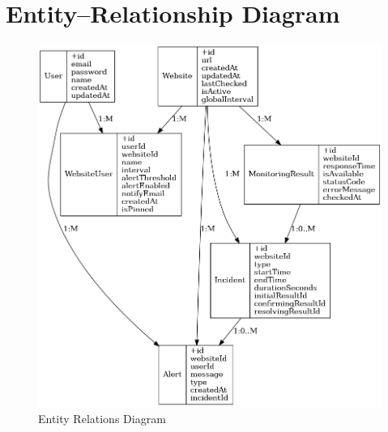 \section{Entity–Relationship Diagram}
\label{app:er_diagram}

\begin{figure}[H]
        \centering
        \includegraphics[width=\textwidth]{figures/diagrams/ER_diagram.png}
        \caption{Entity Relations Diagram}
        \label{fig:er_diagram}
\end{figure}